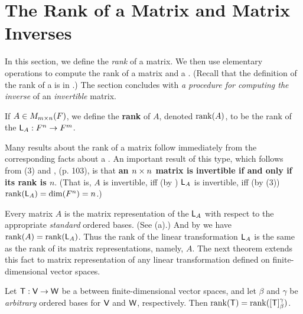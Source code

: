 \section{The Rank of a Matrix and Matrix Inverses} \label{sec 3.2}

In this section, we define the \emph{rank} of a matrix.
We then use elementary operations to compute the rank of a matrix and a \LTRAN{}.
(Recall that the definition of the rank of a \LTRAN{} is in .)
The section concludes with \emph{a procedure for computing the inverse} of an \emph{invertible} matrix.

\begin{definition} \label{def 3.3}
If \(A \in M_{m \times n}(F)\), we define the \textbf{rank} of \(A\), denoted \(\mathrm{rank}(A)\), to be the rank of the \LTRAN{} \(\textsf{L}_A: F^n \to F^m\).
\end{definition}

\begin{remark} \label{remark 3.2.1}
Many results about the rank of a matrix follow immediately from the corresponding facts about a \LTRAN{}.
An important result of this type, which follows from (3) and , (p. 103), is that \textbf{an \(n \times n\) matrix is invertible if and only if its rank is \(n\)}.
(That is, \(A\) is invertible, iff (by ) \(\textsf{L}_A\) is invertible, iff (by (3)) \(\mathrm{rank}(\textsf{L}_A) = \dim(F^n) = n\).) 
\end{remark}

\begin{remark} \label{remark 3.2.2}
Every matrix \(A\) is the matrix representation of the \LTRAN{} \(\textsf{L}_A\) with respect to the appropriate \emph{standard} ordered bases.
(See (a).)
And by  we have \(\mathrm{rank}(A) = \mathrm{rank}(\textsf{L}_A)\).
Thus the rank of the linear transformation \(\textsf{L}_A\) is the same as the rank of  its matrix representations, namely, \(A\).
The next theorem extends this fact to  matrix representation of any linear transformation defined on finite-dimensional vector spaces.
\end{remark}

\begin{theorem} \label{thm 3.3}
Let \(\textsf{T} : \textsf{V} \to \textsf{W}\) be a \LTRAN{} between finite-dimensional vector spaces, and let \(\beta\) and \(\gamma\) be \emph{arbitrary} ordered bases for \(\textsf{V}\) and \(\textsf{W}\), respectively.
Then \(\mathrm{rank}(\textsf{T}) = \mathrm{rank}([\textsf{T}]_{\beta}^{\gamma})\).
\end{theorem}

